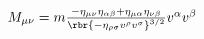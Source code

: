 \documentclass{standalone}
\begin{document}
$
M_{\mu\nu} = m\frac{-\eta_{\mu\nu}\eta_{\alpha\beta} + \eta_{\mu\alpha} 
\eta_{\nu\beta}}{\rbr{-\eta_{\rho\sigma}v^\rho v^\sigma}^{3/2}} v^\alpha v^\beta
$
\end{document}
